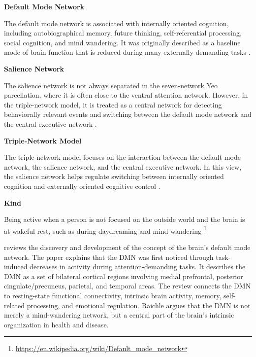 \documentclass{book}
\providecommand{\ProjectDeepHeading}[2]{%
    \par\medskip\noindent\textbf{#2}\par\smallskip
}
\providecommand{\seeherefooter}[1]{\footnote{\url{#1}}}
\begin{document}
    
    \ProjectDeepHeading{9}{Default Mode Network}
        
        The default mode network is associated with internally oriented cognition, including autobiographical memory, future thinking, self-referential processing, social cognition, and mind wandering. It was originally described as a baseline mode of brain function that is reduced during many externally demanding tasks \citep{raichle-2001-a-default-mode-of-brain-function}.
    
    
    \ProjectDeepHeading{9}{Salience Network}
        
        The salience network is not always separated in the seven-network Yeo parcellation, where it is often close to the ventral attention network. However, in the triple-network model, it is treated as a central network for detecting behaviorally relevant events and switching between the default mode network and the central executive network \citep{menon-2011-large-scale-brain-networks-and-psychopathology,menon-2010-saliency-switching-attention-and-control}.
    
    
    \ProjectDeepHeading{9}{Triple-Network Model}
        
        The triple-network model focuses on the interaction between the default mode network, the salience network, and the central executive network. In this view, the salience network helps regulate switching between internally oriented cognition and externally oriented cognitive control \citep{menon-2011-large-scale-brain-networks-and-psychopathology}.

\ProjectDeepHeading{7}{Kind}


Being active when a person is not focused on the outside world and the brain is at wakeful rest, such as during daydreaming and mind-wandering \seeherefooter{https://en.wikipedia.org/wiki/Default_mode_network}
    
    \cite{raichle-2015-the-brains-default-mode-network} reviews the discovery and development of the concept of the brain’s default mode network. The paper explains that the DMN was first noticed through task-induced decreases in activity during attention-demanding tasks.
    It describes the DMN as a set of bilateral cortical regions involving medial prefrontal, posterior cingulate/precuneus, parietal, and temporal areas. The review connects the DMN to resting-state functional connectivity, intrinsic brain activity, memory, self-related processing, and emotional regulation. Raichle argues that the DMN is not merely a mind-wandering network, but a central part of the brain’s intrinsic organization in health and disease.
    
\end{document}
